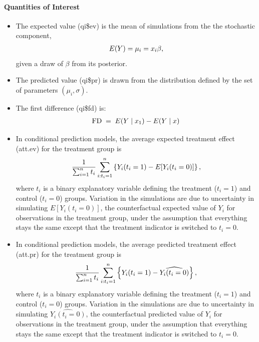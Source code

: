 \documentclass[letterpaper,10pt,english]{sphinxmanual}
\begin{document}
\paragraph{Quantities of Interest}
\label{zelig-normal:quantities-of-interest}\begin{itemize}
\item {} 
The expected value (qi\$ev) is the mean of simulations from the the
stochastic component,
\begin{gather}
\begin{split}E(Y) = \mu_i = x_i \beta,\end{split}\notag
\end{gather}
given a draw of \(\beta\) from its posterior.

\item {} 
The predicted value (qi\$pr) is drawn from the distribution defined by
the set of parameters \((\mu_i, \sigma)\).

\item {} 
The first difference (qi\$fd) is:
\begin{gather}
\begin{split}\textrm{FD}\; = \;E(Y \mid x_1) -  E(Y \mid x)\end{split}\notag
\end{gather}
\item {} 
In conditional prediction models, the average expected treatment
effect (att.ev) for the treatment group is
\begin{gather}
\begin{split}\frac{1}{\sum_{i=1}^n t_i}\sum_{i:t_i=1}^n \left\{ Y_i(t_i=1) -
      E[Y_i(t_i=0)] \right\},\end{split}\notag
\end{gather}
where \(t_i\) is a binary explanatory variable defining the
treatment (\(t_i=1\)) and control (\(t_i=0\)) groups.
Variation in the simulations are due to uncertainty in simulating
\(E[Y_i(t_i=0)]\), the counterfactual expected value of
\(Y_i\) for observations in the treatment group, under the
assumption that everything stays the same except that the treatment
indicator is switched to \(t_i=0\).

\item {} 
In conditional prediction models, the average predicted treatment
effect (att.pr) for the treatment group is
\begin{gather}
\begin{split}\frac{1}{\sum_{i=1}^n t_i}\sum_{i:t_i=1}^n \left\{ Y_i(t_i=1) -
      \widehat{Y_i(t_i=0)} \right\},\end{split}\notag
\end{gather}
where \(t_i\) is a binary explanatory variable defining the
treatment (\(t_i=1\)) and control (\(t_i=0\)) groups.
Variation in the simulations are due to uncertainty in simulating
\(\widehat{Y_i(t_i=0)}\), the counterfactual predicted value of
\(Y_i\) for observations in the treatment group, under the
assumption that everything stays the same except that the treatment
indicator is switched to \(t_i=0\).

\end{itemize}
\end{document}
